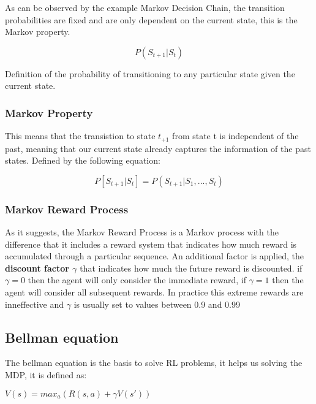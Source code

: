        As can be observed by the example Markov Decision Chain, the transition probabilities are fixed and are only dependent on the current state, this is the Markov property.

       \begingroup
       \Large
       \begin{equation*}
       P(S_{t+1}|S_t)
       \end{equation*}
       \endgroup

       Definition of the probability of transitioning to any particular state given the current state.

       \subsubsection*{Markov Property}
       This means that the transistion to state $t_{+1}$ from state {t} is independent of the past, meaning that our current state already captures the information of the past states.
       Defined by the following equation:

       \begingroup
       \Large
       \begin{equation*}
       P[S_{t+1}|S_t] = P(S_{t+1}|S_1,...,S_t)
       \end{equation*}
       \endgroup

       \subsubsection*{Markov Reward Process}
       As it suggests, the Markov Reward Process is a Markov process with the difference that it includes a reward system that indicates how much reward is accumulated through a particular sequence.
       An additional factor is applied, the \textbf{discount factor $\gamma$} that indicates how much the future reward is discounted. if $\gamma = 0$ 
       then the agent will only consider the immediate reward, if $\gamma = 1$ then the agent will consider all subsequent rewards. 
       In practice this extreme rewards are inneffective and $\gamma$ is usually set to values between 0.9 and 0.99

       \subsection{Bellman equation}
       The bellman equation is the basis to solve RL problems, it helps us solving the MDP, it is defined as:
       
       $V(s) = max_a (R(s,a)+\gamma V(s')) $ 
       
